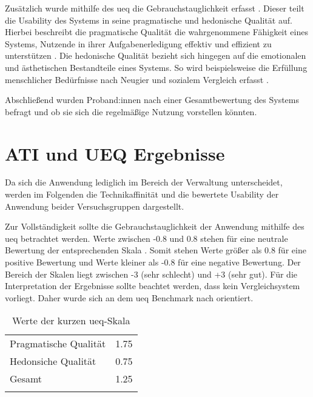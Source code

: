 Zusätzlich wurde mithilfe des \ac{ueq} die Gebrauchstauglichkeit erfasst
\cite{laugwitz2009subjektive}. Dieser teilt die Usability des Systems in seine pragmatische und
hedonische Qualität auf. Hierbei beschreibt die pragmatische Qualität die wahrgenommene Fähigkeit
eines Systems, Nutzende in ihrer Aufgabenerledigung effektiv und effizient zu unterstützen
\cite{hassenzahl_thing_2004}. Die hedonische Qualität bezieht sich hingegen auf die emotionalen und
ästhetischen Bestandteile eines Systems. So wird beispielsweise die Erfüllung menschlicher
Bedürfnisse nach Neugier und sozialem Vergleich erfasst \cite{hassenzahl_thing_2004}.

Abschließend wurden Proband:innen nach einer Gesamtbewertung des Systems befragt und ob sie sich die
regelmäßige Nutzung vorstellen könnten.



\section{ATI und UEQ Ergebnisse}
\label{sec:prese}
Da sich die Anwendung lediglich im Bereich der Verwaltung unterscheidet, werden im
Folgenden die Technikaffinität und die bewertete Usability der Anwendung beider
Versuchsgruppen dargestellt.

Zur Vollständigkeit sollte die Gebrauchstauglichkeit der Anwendung mithilfe des
\ac{ueq} betrachtet werden. Werte zwischen -0.8 und 0.8 stehen für eine neutrale
Bewertung der entsprechenden Skala \cite{schrepp2018user}. Somit stehen Werte
größer als 0.8 für eine positive Bewertung und Werte kleiner als -0.8 für eine
negative Bewertung. Der Bereich der Skalen liegt zwischen -3 (sehr schlecht) und
+3 (sehr gut). Für die Interpretation der Ergebnisse sollte beachtet werden,
dass kein Vergleichsystem vorliegt. Daher wurde sich an dem \ac{ueq} Benchmark
nach  orientiert. 
\begin{table}[h]
        \centering
        \caption{Werte der kurzen \ac{ueq}-Skala}
        \begin{tabular}{lc}
                \arrayrulecolor{maincolor}\hline
                Pragmatische Qualität & 1.75 \\
                Hedonsiche Qualität   & 0.75 \\
                Gesamt                & 1.25 \\
                \arrayrulecolor{maincolor}\hline
        \end{tabular}
        \label{table:ueq}
\end{table}

